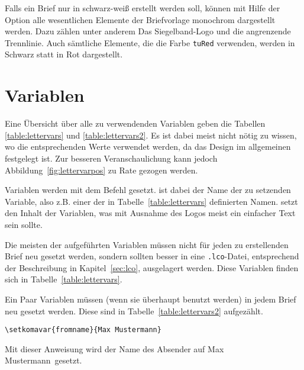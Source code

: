Falls ein Brief nur in schwarz-weiß erstellt werden soll, können mit Hilfe
der Option  alle wesentlichen Elemente der Briefvorlage monochrom
dargestellt werden. Dazu zählen unter anderem Das Siegelband-Logo und die
angrenzende Trennlinie.
Auch sämtliche Elemente, die die Farbe \texttt{tuRed} verwenden, werden
in Schwarz statt in Rot dargestellt.

\section{Variablen}\label{sec:lettervars}

Eine Übersicht über alle zu verwendenden Variablen geben die
Tabellen \ref{table:lettervars} und \ref{table:lettervars2}.
Es ist dabei meist nicht nötig zu wissen,
wo die entsprechenden Werte verwendet werden, da das Design im allgemeinen
festgelegt ist. Zur besseren Veranschaulichung kann jedoch
Abbildung~\ref{fig:lettervarpos} zu Rate gezogen werden.

\begin{Declaration}
\end{Declaration}

Variablen werden mit dem Befehl  gesetzt.
 ist dabei der Name der zu setzenden Variable, also z.B. einer der in
Tabelle~\ref{table:lettervars} definierten Namen.  setzt den
Inhalt der Variablen, was mit Ausnahme des Logos meist ein einfacher
Text sein sollte.

Die meisten der aufgeführten Variablen müssen nicht für jeden zu erstellenden
Brief neu gesetzt werden, sondern sollten besser in eine \texttt{.lco}-Datei,
entsprechend der Beschreibung in Kapitel~\ref{sec:lco}, ausgelagert werden.
Diese Variablen finden sich in Tabelle~\ref{table:lettervars}.

Ein Paar Variablen müssen (wenn sie überhaupt benutzt werden) in jedem Brief
neu gesetzt werden. Diese sind in Tabelle~\ref{table:lettervars2} aufgezählt.

\begin{example}
\begin{lstlisting}
\setkomavar{fromname}{Max Mustermann}
\end{lstlisting}
Mit dieser Anweisung wird der Name des Absender auf \glqq Max Mustermann\grqq\ 
gesetzt.
\end{example}


